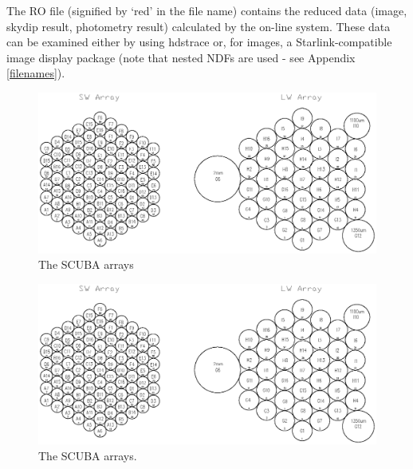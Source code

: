 \documentclass[twoside,11pt]{article}
\newcommand{\task}[1]{{\sf #1}}
\newcommand{\hdstrace}{\xref{\task{hdstrace}}{sun102}{}}
\newcommand{\htmlimage}[1]{}
\newenvironment{latexonly}{}{}
\newcommand{\xref}[3]{#1}
\renewcommand{\_}{\texttt{\symbol{95}}}
\begin{document}
The RO file (signified by `\_red\_' in the file name) contains the reduced
data (image, skydip result, photometry result) calculated by the on-line
system. These data can be examined either by using \hdstrace\cite{hdstrace} or, for images, a Starlink-compatible image display
package (note that nested NDFs are used - see Appendix \ref{filenames}).

\begin{latexonly}
\begin{center}
\begin{figure}
\hspace*{20mm}
\includegraphics[width=0.90\textheight,angle=90]{sun216_arrays.eps}
\caption{The SCUBA arrays}
\label{arrays}
\end{figure}
\end{center}
\end{latexonly}

\begin{htmlonly}
\begin{figure}
\includegraphics[scale=0.65]{sun216_arrays.eps}
\caption{The SCUBA arrays.}
\label{arrays}
\end{figure}

\end{htmlonly}
\end{document}
